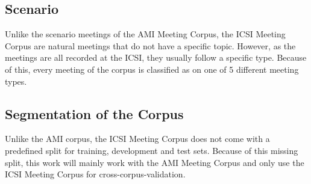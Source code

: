 \subsection{Scenario}

Unlike the scenario meetings of the AMI Meeting Corpus, the ICSI Meeting Corpus are natural meetings that do not have a specific topic.
However, as the meetings are all recorded at the ICSI, they usually follow a specific type.
Because of this, every meeting of the corpus is classified as on one of 5 different meeting types. \cite{Janin}

\subsection{Segmentation of the Corpus}

Unlike the AMI corpus, the ICSI Meeting Corpus does not come with a predefined split for training, development and test sets.
Because of this missing split, this work will mainly work with the AMI Meeting Corpus and only use the ICSI Meeting Corpus for cross-corpus-validation.